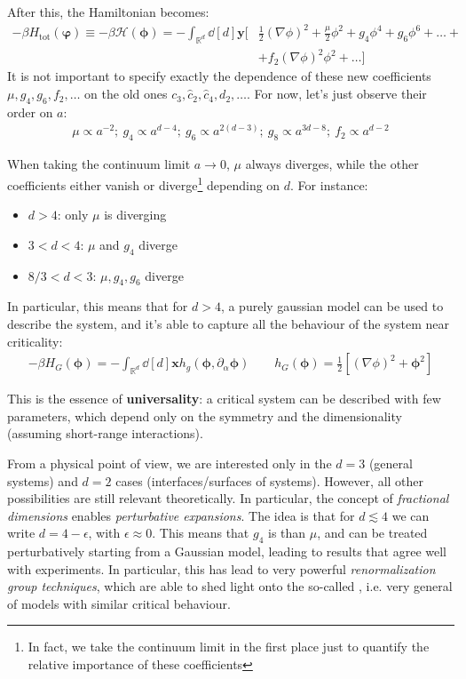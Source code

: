 \documentclass[../../main.tex]{subfiles}
\begin{document}
After this, the Hamiltonian becomes:
\begin{align}\label{eqn:continuum-limit}
    -\beta H_{\mathrm{tot}}(\bm{\varphi}) \equiv -\beta \mathcal{H}(\bm{\phi}) = - \int_{\mathbb{R}^d} \dd[d]{\bm{y}} \Big[&\frac{1}{2}(\nabla \phi)^2 + \frac{\mu}{2} \phi^2 + g_4 \phi^4 + g_6 \phi^6 + \dots +\\
    &+ f_2 (\nabla \phi)^2 \phi^2 + \dots \Big]
\end{align}
It is not important to specify exactly the dependence of these new coefficients $\mu, g_4, g_6, f_2, \dots$ on the old ones $c_3, \hat{c}_2, \hat{c}_4, d_2, \dots$. For now, let's just observe their order on $a$:
\begin{align*}
    \mu \propto a^{-2}; \> g_4 \propto a^{d-4}; \> g_6 \propto a^{2(d-3)}; \> g_8 \propto a^{3d-8}; \> f_2 \propto a^{d-2}
\end{align*}

When taking the continuum limit $a \to 0$, $\mu$ always diverges, while the other coefficients either vanish or diverge\footnote{In fact, we take the continuum limit in the first place just to quantify the relative importance of these coefficients} depending on $d$. For instance:
\begin{itemize}
    \item $d > 4$: only $\mu$ is diverging
    \item $3 < d < 4$: $\mu$ and $g_4$ diverge
    \item $8/3 < d < 3$: $\mu, g_4, g_6$ diverge
\end{itemize}
In particular, this means that for $d > 4$, a purely gaussian model can be used to describe the system, and it's able to capture all the behaviour of the system near criticality:
\begin{align*}
    -\beta H_G(\bm{\phi}) = - \int_{\mathbb{R}^d}\dd[d]{\bm{x}} h_g(\bm{\phi}, \partial_\alpha \bm{\phi}) \qquad h_G(\bm{\phi}) = \frac{1}{2}\left[(\nabla \phi)^2 + \bm{\phi}^2 \right] 
\end{align*}

This is the essence of \textbf{universality}: a critical system can be described with few parameters, which depend only on the symmetry and the dimensionality (assuming short-range interactions).   

\medskip

From a physical point of view, we are interested only in the $d=3$ (general systems) and $d=2$ cases (interfaces/surfaces of systems). However, all other possibilities are still relevant theoretically. In particular, the concept of \textit{fractional dimensions} enables \textit{perturbative expansions}. The idea is that for $d \lesssim 4$ we can write $d = 4 - \epsilon$, with $\epsilon \approx 0$. This means that $g_4$ is  than $\mu$, and can be treated perturbatively starting from a Gaussian model, leading to results that agree well with experiments. In particular, this has lead to very powerful \textit{renormalization group techniques}, which are able to shed light onto the so-called , i.e. very general  of models with similar critical behaviour.
\end{document}
